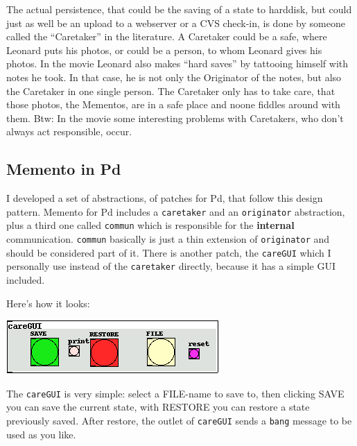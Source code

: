 \documentclass[10pt,english]{scrartcl}
\begin{document}
The actual persistence, that could be the saving of a state to harddisk,
but could just as well be an upload to a webserver or a CVS check-in, is
done by someone called the ``Caretaker'' in the literature. A Caretaker could
be a safe, where Leonard puts his photos, or could be a person, to whom
Leonard gives his photos. In the movie Leonard also makes ``hard saves'' by
tattooing himself with notes he took. In that case, he is not only the
Originator of the notes, but also the Caretaker in one single person.  The
Caretaker only has to take care, that those photos, the Mementos, are in a
safe place and noone fiddles around with them. Btw: In the movie some
interesting problems with Caretakers, who don't always act responsible,
occur.



\hypertarget{memento-in-pd}{}
\subsection*{Memento in Pd}

I developed a set of abstractions, of patches for Pd, that follow this
design pattern. Memento for Pd includes a \texttt{caretaker} and an
\texttt{originator} abstraction, plus a third one called \texttt{commun} which is
responsible for the \textbf{internal} communication. \texttt{commun} basically is
just a thin extension of \texttt{originator} and should be considered part of
it.  There is another patch, the \texttt{careGUI} which I personally use instead
of the \texttt{caretaker} directly, because it has a simple GUI included.

Here's how it looks:

\includegraphics{caregui.png}

The \texttt{careGUI} is very simple: select a FILE-name to save to, then
clicking SAVE you can save the current state, with RESTORE you can restore
a state previously saved. After restore, the outlet of \texttt{careGUI} sends a
\texttt{bang} message to be used as you like.
\end{document}
